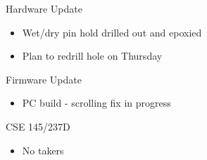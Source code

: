 \begin{frame}{Hardware Update}
    \begin{itemize}
      \item Wet/dry pin hold drilled out and epoxied
      \item Plan to redrill hole on Thursday
    \end{itemize}
\end{frame}

\begin{frame}{Firmware Update}
  \begin{itemize}
    \item PC build - scrolling fix in progress
  \end{itemize}
\end{frame}

\begin{frame}{CSE 145/237D}
  \begin{itemize}
    \item No takers
  \end{itemize}
\end{frame}



